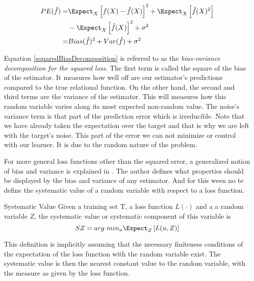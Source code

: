 \begin{equation}\label{squaredBiasDecomposition}
\begin{split}
PE( \hat{f} ) = & \Expect_X \left[   f(X)  - \hat{f}(X) \right]^2 +  \Expect_X \left[ \hat{f}(X)^2  \right] \\
& - \Expect_X \left[ \hat{f}(X)  \right]^2  + \sigma^2 \\
= & Bias(\hat{f})^2 + Var(\hat{f}) + \sigma^2
\end{split}
\end{equation}

Equation \ref{squaredBiasDecomposition} is referred to as the \textit{bias-variance decomposition for the squared loss}. The first term is called the square of the bias of the estimator. It measures how well off are our estimator's predictions compared to the true relational function. On the other hand, the second and third terms are the variance of the estimator. This will measures how this random variable varies along its most expected non-random value. The noise's variance term is that part of the prediction error which is irreducible. Note that we have already taken the expectation over the target and that is why we are left with the target's noise. This part of the error we can not minimize or control with our learner. It is due to the random nature of the problem.

For more general loss functions other than the squared error, a generalized notion of bias and variance is explained in \cite{james-biasVarianceGeneral}. The author defines what properties should be displayed by the bias and variance of any estimator. And for this ween no te define the systematic value of a random variable with respect to a loss function.

\begin{definition}{Systematic Value}
	Given a training set $\mathrm{T}$, a loss function $L(\cdot)$ and a a random variable $Z$, the systematic value or systematic component of this variable is 
	$$ SZ  =  arg \ min_u \Expect_{Z} \left[ L(u,Z) \right]$$
\end{definition}

This definition is implicitly assuming that the necessary finiteness conditions of the expectation of the loss function with the random variable exist. The systematic value is then the nearest constant value to the random variable, with the measure as given by the loss function.



